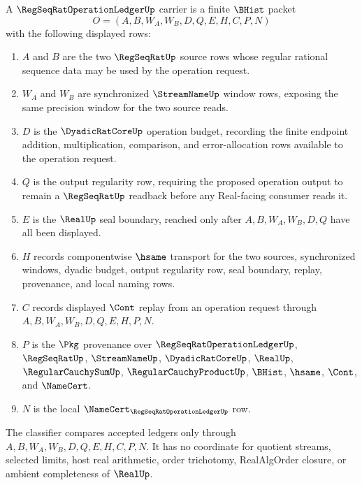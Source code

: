 \begin{definition}
\label{def:regseqrat-operation-ledger-carrier}
A $\RegSeqRatOperationLedgerUp$ carrier is a finite $\BHist$ packet
$$
O=(A,B,W_A,W_B,D,Q,E,H,C,P,N)
$$
with the following displayed rows:
\begin{enumerate}
\item $A$ and $B$ are the two $\RegSeqRatUp$ source rows whose regular rational sequence data may be used by the operation request.
\item $W_A$ and $W_B$ are synchronized $\StreamNameUp$ window rows, exposing the same precision window for the two source reads.
\item $D$ is the $\DyadicRatCoreUp$ operation budget, recording the finite endpoint addition, multiplication, comparison, and error-allocation rows available to the operation request.
\item $Q$ is the output regularity row, requiring the proposed operation output to remain a $\RegSeqRatUp$ readback before any Real-facing consumer reads it.
\item $E$ is the $\RealUp$ seal boundary, reached only after $A,B,W_A,W_B,D,Q$ have all been displayed.
\item $H$ records componentwise $\hsame$ transport for the two sources, synchronized windows, dyadic budget, output regularity row, seal boundary, replay, provenance, and local naming rows.
\item $C$ records displayed $\Cont$ replay from an operation request through $A,B,W_A,W_B,D,Q,E,H,P,N$.
\item $P$ is the $\Pkg$ provenance over $\RegSeqRatOperationLedgerUp$, $\RegSeqRatUp$, $\StreamNameUp$, $\DyadicRatCoreUp$, $\RealUp$, $\RegularCauchySumUp$, $\RegularCauchyProductUp$, $\BHist$, $\hsame$, $\Cont$, and $\NameCert$.
\item $N$ is the local $\NameCert_{\RegSeqRatOperationLedgerUp}$ row.
\end{enumerate}
The classifier compares accepted ledgers only through $A,B,W_A,W_B,D,Q,E,H,C,P,N$. It has no coordinate for quotient streams, selected limits, host real arithmetic, order trichotomy, RealAlgOrder closure, or ambient completeness of $\RealUp$.
\end{definition}

